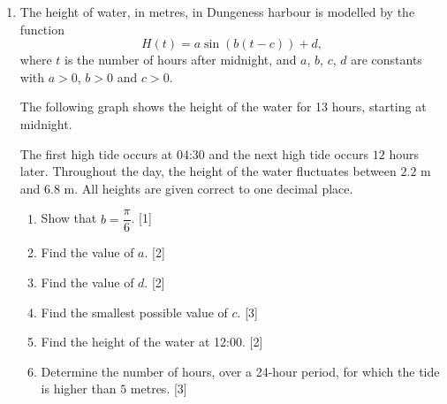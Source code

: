 \documentclass[12pt, twoside]{article}
\begin{document}
\begin{enumerate}
\newpage

\item[3.] [Maximum mark: 13]

The height of water, in metres, in Dungeness harbour is modelled by the function
$$H(t) = a\sin(b(t - c)) + d,$$
where $t$ is the number of hours after midnight, and $a$, $b$, $c$, $d$ are constants with $a > 0$, $b > 0$ and $c > 0$.

The following graph shows the height of the water for 13 hours, starting at midnight.


\begin{center}
\end{center}

The first high tide occurs at 04:30 and the next high tide occurs $12$ hours later. Throughout the day, the height of the water fluctuates between $2.2$ m and $6.8$ m. All heights are given correct to one decimal place.

\begin{enumerate}[itemsep=0.1cm]
  \item Show that $b = \dfrac{\pi}{6}$. \hfill [1]
  \item Find the value of $a$. \hfill [2]
  \item Find the value of $d$. \hfill [2]
  \item Find the smallest possible value of $c$. \hfill [3]
  \item Find the height of the water at 12:00. \hfill [2]
  \item Determine the number of hours, over a 24-hour period, for which the tide is higher than $5$ metres. \hfill [3]
\end{enumerate}


\end{enumerate}
\end{document}
